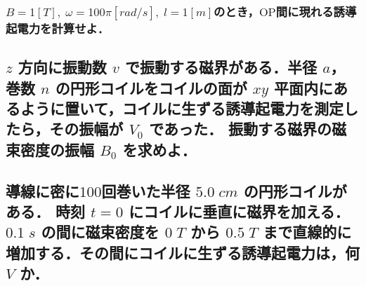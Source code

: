 \documentclass[a4paper, 12pt]{bxjsarticle}
\begin{document}
\subsubsection{\(B=1\si{[T]},\;\omega=100\pi\si{[rad/s]},\;l=1\si{[m]}\)のとき，\(\mathrm{OP}\)間に現れる誘導起電力を計算せよ．}
\vspace{10em}
\newpage
\begin{samepage}
\subsection{\(z\) 方向に振動数 \(v\) で振動する磁界がある．半径 \(a\)，巻数 \(n\) の円形コイルをコイルの面が \(xy\) 平面内にあるように置いて，コイルに生ずる誘導起電力を測定したら，その振幅が \(V_0\) であった．%
振動する磁界の磁束密度の振幅 \(B_0\) を求めよ．}
    \vspace{20em}
\subsection{導線に密に\(100\)回巻いた半径 \(5.0\;\si{cm}\) の円形コイルがある．%
時刻 \(t = 0\) にコイルに垂直に磁界を加える．\(0.1\;\si{s}\) の間に磁束密度を \(0\;\si{T}\) から%
 \(0.5\;\si{T}\) まで直線的に増加する．その間にコイルに生ずる誘導起電力は，何 \(\si{V}\) か．}
\end{samepage}
\end{document}
